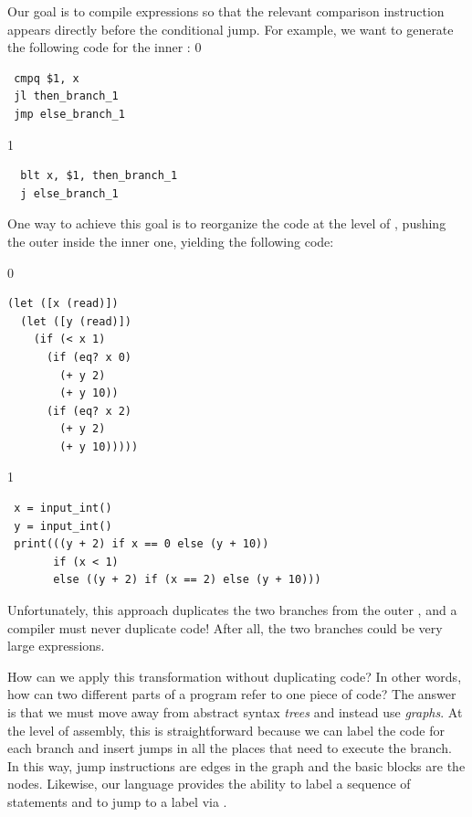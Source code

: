 \documentclass[7x10]{TimesAPriori_MIT}%
\def\racketEd{0}
\def\pythonEd{1}
\def\edition{1}
\def\xeightysixEd{0}
\def\riscvEd{1}
\def\architecture{1}
\newcommand{\pythonColor}[0]{}
\numberwithin{theorem}{chapter}
\numberwithin{definition}{chapter}
\numberwithin{equation}{chapter}
\begin{document}
Our goal is to compile  expressions so that the relevant
comparison instruction appears directly before the conditional jump.
For example, we want to generate the following code for the inner
:
\if\architecture\xeightysixEd
\begin{center}
\begin{minipage}{0.96\textwidth}
\begin{lstlisting}
 cmpq $1, x
 jl then_branch_1
 jmp else_branch_1
\end{lstlisting}
\end{minipage}
\end{center}
\fi
\if\architecture\riscvEd
\begin{center}
\begin{minipage}{0.96\textwidth}
\begin{lstlisting}
  blt x, $1, then_branch_1
  j else_branch_1
\end{lstlisting}
\end{minipage}
\end{center}
\fi
One way to achieve this goal is to reorganize the code at the level of
\LangIf{}, pushing the outer  inside the inner one, yielding
the following code:
\begin{center}
\begin{minipage}{0.96\textwidth}
{\if\edition\racketEd        
\begin{lstlisting}
(let ([x (read)])
  (let ([y (read)])
    (if (< x 1) 
      (if (eq? x 0)
        (+ y 2)
        (+ y 10))
      (if (eq? x 2)
        (+ y 2)
        (+ y 10)))))
\end{lstlisting}
\fi}
{\if\edition\pythonEd\pythonColor
\begin{lstlisting}
 x = input_int()
 y = input_int()
 print(((y + 2) if x == 0 else (y + 10))
       if (x < 1)
       else ((y + 2) if (x == 2) else (y + 10)))
\end{lstlisting}
\fi}
\end{minipage}
\end{center}
Unfortunately, this approach duplicates the two branches from the
outer , and a compiler must never duplicate code!  After all,
the two branches could be very large expressions.

How can we apply this transformation without duplicating code? In
other words, how can two different parts of a program refer to one
piece of code?
%
The answer is that we must move away from abstract syntax \emph{trees}
and instead use \emph{graphs}.
%
At the level of {\ArchName} assembly, this is straightforward because we can
label the code for each branch and insert jumps in all the places that
need to execute the branch. In this way, jump instructions are edges
in the graph and the basic blocks are the nodes.
%
Likewise, our language \LangCIf{} provides the ability to label a
sequence of statements and to jump to a label via .
\end{document}
